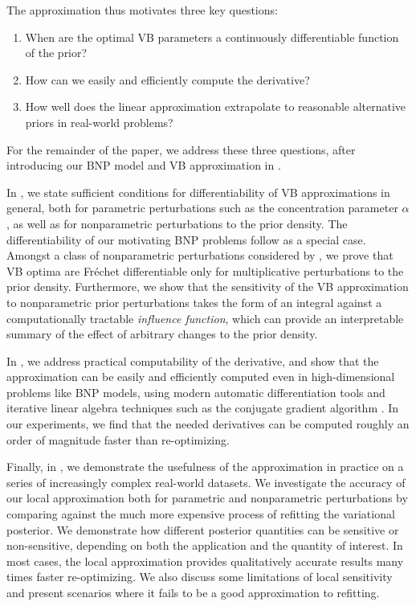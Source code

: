 The approximation thus motivates three key questions:
%
\begin{enumerate}
%
\item {}
    When are the optimal VB parameters a continuously differentiable
    function of the prior?
%
\item {}
    How can we easily and efficiently compute the derivative?
%
\item {}
    How well does the linear approximation extrapolate to reasonable
    alternative priors in real-world problems?
%
\end{enumerate}
%
For the remainder of the paper, we address these three questions, after
introducing our BNP model and VB approximation in .

In , we state sufficient conditions for
differentiability of VB approximations in general, both for parametric
perturbations such as the concentration parameter $\alpha$, as well as for
nonparametric perturbations to the prior density.  The differentiability of our
motivating BNP problems follow as a special case.  Amongst a class of
nonparametric perturbations considered by \citet{gustafson:1996:local}, we prove
that VB optima are Fr{\'e}chet differentiable only for multiplicative
perturbations to the prior density.  Furthermore, we show that the sensitivity
of the VB approximation to nonparametric prior perturbations takes the form of
an integral against a computationally tractable \textit{influence function},
which can provide an interpretable summary of the effect of arbitrary changes to
the prior density.

In , we address practical computability of the
derivative, and show that the approximation can be easily and efficiently
computed even in high-dimensional problems like BNP models, using modern
automatic differentiation tools \citep{baydin:2018:automatic, jax2018github} and
iterative linear algebra techniques such as the conjugate gradient algorithm
\citep{nocedal:2006:numerical}.  In our experiments, we find that the  needed
derivatives can be computed roughly an order of magnitude faster than
re-optimizing.

Finally, in , we demonstrate the usefulness of the approximation
in practice on a series of increasingly complex real-world datasets.  We
investigate the accuracy of our local approximation both for parametric and
nonparametric perturbations by comparing against the much more expensive process
of refitting the variational posterior.  We demonstrate how different posterior
quantities can be sensitive or non-sensitive, depending on both the application
and the quantity of interest.  In most cases, the local approximation provides
qualitatively accurate results many times faster re-optimizing.  We also discuss
some limitations of local sensitivity and present scenarios where it fails to be
a good approximation to refitting.

